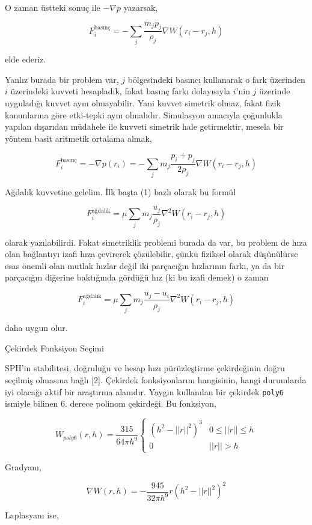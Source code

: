 \documentclass[12pt,fleqn]{article}\usepackage{../../common}
\begin{document}
O zaman üstteki sonuç ile $-\nabla p$ yazarsak,

$$
F_i^{\textrm{basınç}} = - \sum_j \frac{m_j p_j}{\rho_j} \nabla W(r_i-r_j,h)
$$

elde ederiz.

Yanlız burada bir problem var, $j$ bölgesindeki basıncı kullanarak o fark
üzerinden $i$ üzerindeki kuvveti hesapladık, fakat basınç farkı dolayısıyla
$i$'nin $j$ üzerinde uyguladığı kuvvet aynı olmayabilir. Yani kuvvet simetrik
olmaz, fakat fizik kanunlarına göre etki-tepki aynı olmalıdır. Simulasyon
amacıyla çoğunlukla yapılan dışarıdan müdahele ile kuvveti simetrik hale
getirmektir, mesela bir yöntem basit aritmetik ortalama almak,

$$
F_i^{\textrm{basınç}} = - \nabla p(r_i) =
- \sum_j m_j \frac{p_i + p_j}{2 \rho_j} \nabla W(r_i-r_j,h)
$$

Ağdalık kuvvetine gelelim. İlk başta (1) bazlı olarak bu formül

$$
F_i^{\textrm{ağdalık}} = \mu \sum_j m_j \frac{u_j}{\rho_j} \nabla^2 W (r_i-r_j, h)
$$

olarak yazılabilirdi. Fakat simetriklik problemi burada da var, bu problem de
hıza olan bağlantıyı izafi hıza çevirerek çözülebilir, çünkü fiziksel olarak
düşünülürse esas önemli olan mutlak hızlar değil iki parçacığın hızlarının
farkı, ya da bir parçacığın diğerine baktığında gördüğü hız (ki bu izafi demek)
o zaman

$$
F_i^{\textrm{ağdalık}} = \mu \sum_j m_j \frac{u_j-u_i}{\rho_j} \nabla^2 W (r_i-r_j, h)
$$

daha uygun olur.

Çekirdek Fonksiyon Seçimi

SPH'in stabilitesi, doğruluğu ve hesap hızı pürüzleştirme çekirdeğinin doğru
seçilmiş olmasına bağlı [2]. Çekirdek fonksiyonlarını hangisinin, hangi
durumlarda iyi olacağı aktif bir araştırma alanıdır. Yaygın kullanılan bir
çekirdek \verb!poly6! ismiyle bilinen 6. derece polinom çekirdeği. Bu fonksiyon,

$$
W_{poly6} (r, h) = \frac{315}{64 \pi h^9}
\left\{ \begin{array}{ll}
(h^2 - ||r||^2)^3 & 0 \le ||r|| \le h \\
0 & ||r|| > h
\end{array} \right.
$$

Gradyanı,

$$
\nabla W (r, h) =
- \frac{945}{32 \pi h^9} r ( h^2 - ||r||^2)^2
$$

Laplasyanı ise,
\end{document}
